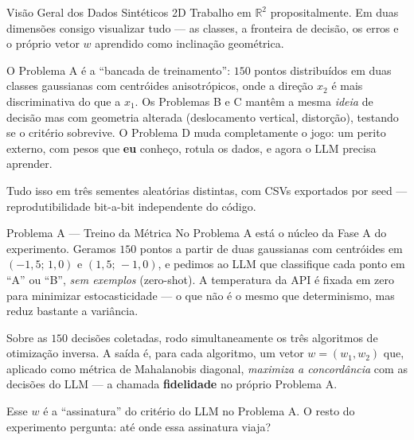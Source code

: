 \documentclass[aspectratio=169,10pt]{beamer}
\begin{document}
\begin{frame}{Vis\~ao Geral dos Dados Sint\'eticos 2D}
  \small
  Trabalho em $\mathbb{R}^2$ propositalmente. Em duas dimens\~oes consigo visualizar tudo --- as classes,
  a fronteira de decis\~ao, os erros e o pr\'oprio vetor $w$ aprendido como inclina\c{c}\~ao geom\'etrica.
  \medskip

  O Problema A \'e a ``bancada de treinamento'': $150$ pontos distribu\'idos em duas classes gaussianas
  com centr\'oides anisotr\'opicos, onde a dire\c{c}\~ao $x_2$ \'e mais discriminativa do que a $x_1$. Os
  Problemas B e C mant\^em a mesma \emph{ideia} de decis\~ao mas com geometria alterada (deslocamento vertical,
  distor\c{c}\~ao), testando se o crit\'erio sobrevive. O Problema D muda completamente o jogo: um perito
  externo, com pesos que \textbf{eu} conhe\c{c}o, rotula os dados, e agora o LLM precisa aprender.
  \medskip

  Tudo isso em tr\^es sementes aleat\'orias distintas, com CSVs exportados por seed --- reprodutibilidade
  bit-a-bit independente do c\'odigo.
\end{frame}

\begin{frame}{Problema A --- Treino da M\'etrica}
  \small
  No Problema A est\'a o n\'ucleo da Fase A do experimento. Geramos $150$ pontos a partir de duas gaussianas
  com centr\'oides em $(-1{,}5;\,1{,}0)$ e $(1{,}5;\,-1{,}0)$, e pedimos ao LLM que classifique cada ponto
  em ``A'' ou ``B'', \emph{sem exemplos} (zero-shot). A temperatura da API \'e fixada em zero para minimizar
  estocasticidade --- o que n\~ao \'e o mesmo que determinismo, mas reduz bastante a vari\^ancia.
  \medskip

  Sobre as $150$ decis\~oes coletadas, rodo simultaneamente os tr\^es algoritmos de otimiza\c{c}\~ao inversa.
  A sa\'ida \'e, para cada algoritmo, um vetor $w = (w_1, w_2)$ que, aplicado como m\'etrica de Mahalanobis
  diagonal, \emph{maximiza a concord\^ancia} com as decis\~oes do LLM --- a chamada \textbf{fidelidade} no
  pr\'oprio Problema A.
  \medskip

  Esse $w$ \'e a ``assinatura'' do crit\'erio do LLM no Problema A. O resto do experimento pergunta:
  at\'e onde essa assinatura viaja?
\end{frame}
\end{document}
